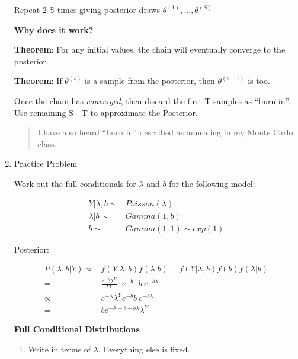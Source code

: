 \documentclass[11pt]{article}
\begin{document}
\begin{enumerate}
Repeat 2 \(\mathbb{S}\) times giving posterior draws \(\theta^{(1)}, ..., \theta^{(S)}\)

\textbf{Why does it work?}

\textbf{Theorem}: For any initial values, the chain will eventually converge to the
posterior.

\textbf{Theorem}: If \(\theta^{(s)}\) is a sample from the posterior, then \(\theta^{(s +
1)}\) is too.

Once the chain has \emph{converged}, then discard the first T samples as ``burn in''.
Use remaining S - T to approximate the Posterior.

\begin{quote}
I have also heard ``burn in'' described as annealing in my Monte Carlo class.
\end{quote}

\item Practice Problem
\label{sec:org89b8892}

Work out the full conditionals for \(\lambda\) and \(b\) for the following model:

\begin{equation}
\begin{split}
Y | \lambda, b \sim & Poisson(\lambda)\\
\lambda | b \sim & Gamma(1, b)\\
b \sim & Gamma(1, 1) \sim exp(1)
\end{split}
\end{equation}

Posterior:

\begin{equation}
\begin{split}
P(\lambda, b | Y) \propto & f(Y | \lambda, b) f(\lambda | b) = f(Y | \lambda, b) f(b) f(\lambda | b)\\
 = & \frac{e^{- \lambda} \lambda^Y}{Y !} \cdot e^{-b} \cdot b \ e^{-b \lambda}\\
\propto & e^{- \lambda} \lambda^Y e^{-b} b \ e^{-b \lambda}\\
= & b e^{- \lambda - b - b \lambda} \lambda^Y
\end{split}
\end{equation}

\textbf{Full Conditional Distributions}


\begin{enumerate}
\item Write in terms of \(\lambda\).  Everything else is fixed.
\end{enumerate}


\end{enumerate}
\end{document}
